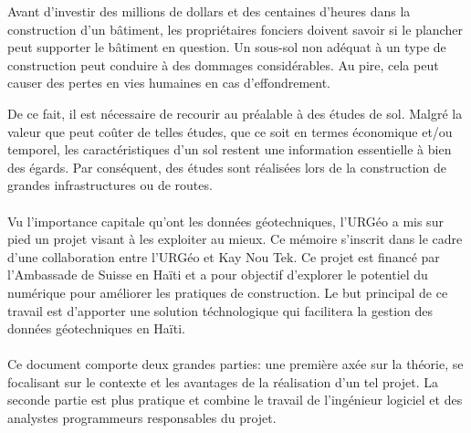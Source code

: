 
    \par
    Avant d’investir des millions de dollars et des centaines d’heures dans la 
    construction d'un bâtiment, les propriétaires fonciers doivent savoir si le 
    plancher peut supporter le bâtiment en question.
    Un sous-sol non adéquat à un type de construction peut conduire à des 
    dommages considérables. Au pire, cela peut causer des pertes en vies humaines 
    en cas d'effondrement.
    \par
    De ce fait, il est nécessaire de recourir au préalable à des études de sol.   
    Malgré la valeur que peut coûter de telles études, que ce soit en termes
    économique et/ou temporel, les caractéristiques d’un sol restent une
    information essentielle à bien des égards. Par conséquent, des études sont 
    réalisées lors de la construction de grandes infrastructures ou de routes. 
    
    \paragraph{}
    Vu l'importance capitale qu'ont les données géotechniques, l'URGéo a
    mis sur pied un projet visant à les exploiter au mieux.
    Ce mémoire s'inscrit dans le cadre d'une collaboration entre
    l'URGéo et Kay Nou Tek. Ce projet est financé par l’Ambassade
    de Suisse en Haïti et a pour objectif d’explorer le potentiel 
    du numérique pour améliorer les pratiques de construction.
    Le but principal de ce travail est
    d'apporter une solution téchnologique  qui facilitera la 
    gestion des données géotechniques en Haïti.
    \paragraph{}
    Ce document comporte deux grandes parties: une première axée
    sur la théorie, se focalisant sur le contexte et les avantages
    de la réalisation d'un tel projet. La seconde partie est plus pratique
    et combine le travail de l'ingénieur logiciel et des analystes programmeurs responsables
    du projet.
